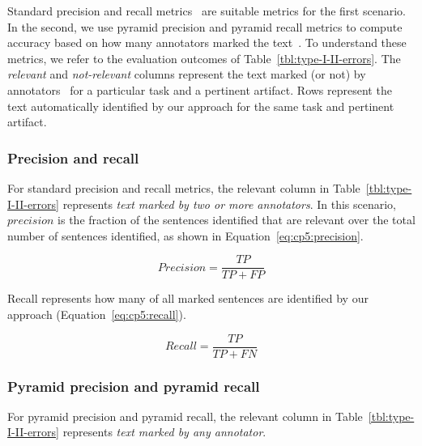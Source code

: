 

Standard precision and recall metrics~\cite{Manning2009IR} are suitable metrics for the first scenario. In the second, we use pyramid precision and pyramid recall metrics
to compute accuracy based on how many annotators marked the text~\cite{Nenkova2004, Lotufo2012}. 
To understand these metrics, we refer to the evaluation outcomes of Table~\ref{tbl:type-I-II-errors}. 
The \textit{relevant} and \textit{not-relevant} columns represent the text 
marked (or not) by annotators~\cite{Lotufo2012} for a particular task and a pertinent artifact. Rows represent the text automatically identified by our approach for the same task and pertinent artifact.





\subsubsection{Precision and recall}



For standard precision and recall metrics, the relevant column in Table~\ref{tbl:type-I-II-errors} represents \textit{text marked by two or more annotators}. 
In this scenario, $precision$ is the fraction of the sentences
 identified that are relevant over the total number of sentences identified, as shown in Equation~\ref{eq:cp5:precision}.


\begin{equation}
\label{eq:cp5:precision}    
    Precision = \frac{TP}{TP + FP}
\end{equation}

\vspace{2mm}
Recall represents how many of all marked sentences are identified by our approach (Equation~\ref{eq:cp5:recall}).


\begin{equation}
\label{eq:cp5:recall}        
    Recall = \frac{TP}{TP + FN}
\end{equation}




\subsubsection{Pyramid precision and pyramid recall}


For pyramid precision and pyramid recall, the relevant column in Table~\ref{tbl:type-I-II-errors} represents \textit{text marked by any annotator}. 


